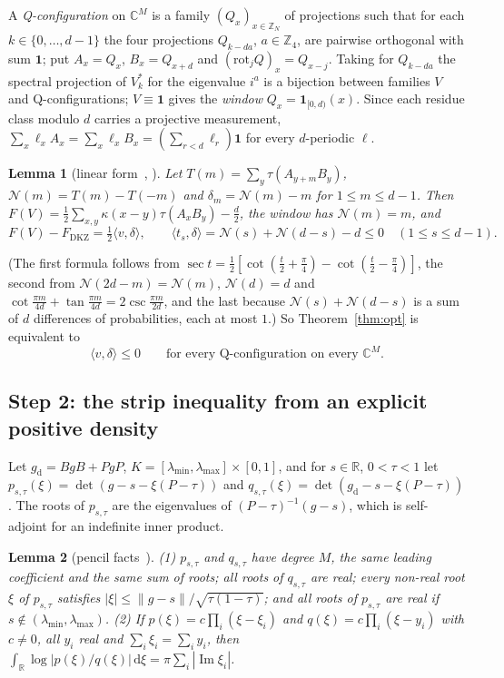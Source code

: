 \documentclass[11pt]{article}
\newtheorem{lemma}{Lemma}[section]
\theoremstyle{remark}
\numberwithin{equation}{section}
\newcommand{\Z}{\mathbb{Z}}
\newcommand{\R}{\mathbb{R}}
\newcommand{\C}{\mathbb{C}}
\renewcommand{\Im}{\operatorname{Im}}
\newcommand{\FD}{F_{\mathrm{DKZ}}}
\newcommand{\one}{\mathbf{1}}
\newcommand{\ip}[2]{\langle #1,#2\rangle}
\newcommand{\cN}{\mathcal{N}}
\newcommand{\lmin}{\lambda_{\min}}
\newcommand{\lmax}{\lambda_{\max}}
\newcommand{\dd}{\,\mathrm{d}}
\begin{document}
A \emph{Q-configuration} on $\C^M$ is a family $(Q_x)_{x\in\Z_N}$ of projections such that for each
$k\in\{0,\dots,d-1\}$ the four projections $Q_{k-da}$, $a\in\Z_4$, are pairwise orthogonal with sum $\one$; put
$A_x=Q_x$, $B_x=Q_{x+d}$ and $(\mathrm{rot}_jQ)_x=Q_{x-j}$. Taking for $Q_{k-da}$ the spectral projection of $V_k^*$ for
the eigenvalue $i^a$ is a bijection between families $V$ and Q-configurations; $V\equiv\one$ gives the \emph{window}
$Q_x=\one_{[0,d)}(x)$. Since each residue class modulo $d$ carries a projective measurement,
$\sum_x\ell_xA_x=\sum_x\ell_xB_x=(\sum_{r<d}\ell_r)\one$ for every $d$-periodic $\ell$.

\begin{lemma}[linear form~{\cite[eq.~(13)]{MSclassical}, \cite[Lemmas~2.4, 2.5]{MSmath}}]\label{lem:linearform}
Let $T(m)=\sum_y\tau(A_{y+m}B_y)$, $\cN(m)=T(m)-T(-m)$ and $\delta_m=\cN(m)-m$ for $1\le m\le d-1$. Then
$F(V)=\frac12\sum_{x,y}\kappa(x-y)\tau(A_xB_y)-\frac d2$, the window has $\cN(m)=m$, and
\[
F(V)-\FD=\tfrac12\ip v\delta,\qquad \ip{t_s}\delta=\cN(s)+\cN(d-s)-d\le0\quad(1\le s\le d-1).
\]
\end{lemma}

(The first formula follows from $\sec t=\frac12[\cot(\frac t2+\frac\pi4)-\cot(\frac t2-\frac\pi4)]$, the second from
$\cN(2d-m)=\cN(m)$, $\cN(d)=d$ and $\cot\frac{\pi m}{4d}+\tan\frac{\pi m}{4d}=2\csc\frac{\pi m}{2d}$, and the last because
$\cN(s)+\cN(d-s)$ is a sum of $d$ differences of probabilities, each at most $1$.) So Theorem~\ref{thm:opt} is
equivalent to
\begin{equation}\label{eq:target}
\ip v\delta\le0\qquad\text{for every Q-configuration on every }\C^M .
\end{equation}

\subsection{Step 2: the strip inequality from an explicit positive density}\label{subsec:strip}
Let $g_{\mathrm d}=BgB+PgP$, $K=[\lmin,\lmax]\times[0,1]$, and for $s\in\R$, $0<\tau<1$ let
$p_{s,\tau}(\xi)=\det(g-s-\xi(P-\tau))$ and $q_{s,\tau}(\xi)=\det(g_{\mathrm d}-s-\xi(P-\tau))$. The roots of
$p_{s,\tau}$ are the eigenvalues of $(P-\tau)^{-1}(g-s)$, which is self-adjoint for an indefinite inner product.

\begin{lemma}[pencil facts~{\cite[Lemmas~3.3, 3.4]{MSmath}}]\label{lem:pencil}
\textup{(1)} $p_{s,\tau}$ and $q_{s,\tau}$ have degree $M$, the same leading coefficient and the same sum of roots;
all roots of $q_{s,\tau}$ are real; every non-real root $\xi$ of $p_{s,\tau}$ satisfies
$|\xi|\le\|g-s\|/\sqrt{\tau(1-\tau)}$; and all roots of $p_{s,\tau}$ are real if $s\notin(\lmin,\lmax)$.
\textup{(2)} If $p(\xi)=c\prod_i(\xi-\xi_i)$ and $q(\xi)=c\prod_i(\xi-y_i)$ with $c\ne0$, all $y_i$ real and
$\sum_i\xi_i=\sum_iy_i$, then $\int_\R\log|p(\xi)/q(\xi)|\dd\xi=\pi\sum_i|\Im\xi_i|$.
\end{lemma}
\end{document}
